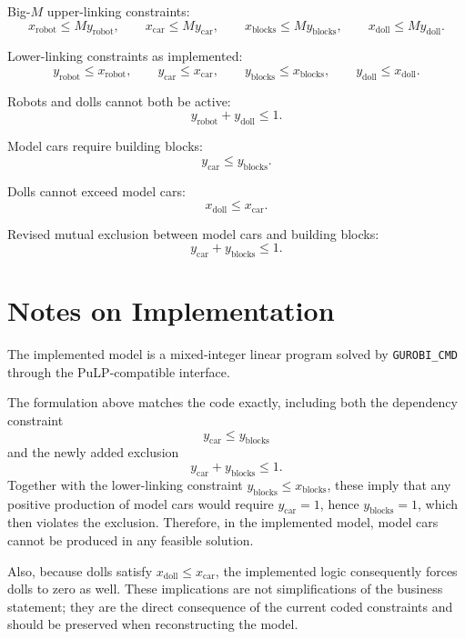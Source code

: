 Big-$M$ upper-linking constraints:
\[
x_{\text{robot}} \le M y_{\text{robot}},\qquad
x_{\text{car}} \le M y_{\text{car}},\qquad
x_{\text{blocks}} \le M y_{\text{blocks}},\qquad
x_{\text{doll}} \le M y_{\text{doll}}.
\]

Lower-linking constraints as implemented:
\[
y_{\text{robot}} \le x_{\text{robot}},\qquad
y_{\text{car}} \le x_{\text{car}},\qquad
y_{\text{blocks}} \le x_{\text{blocks}},\qquad
y_{\text{doll}} \le x_{\text{doll}}.
\]

Robots and dolls cannot both be active:
\[
y_{\text{robot}} + y_{\text{doll}} \le 1.
\]

Model cars require building blocks:
\[
y_{\text{car}} \le y_{\text{blocks}}.
\]

Dolls cannot exceed model cars:
\[
x_{\text{doll}} \le x_{\text{car}}.
\]

Revised mutual exclusion between model cars and building blocks:
\[
y_{\text{car}} + y_{\text{blocks}} \le 1.
\]

\section*{Notes on Implementation}

The implemented model is a mixed-integer linear program solved by \texttt{GUROBI\_CMD} through the PuLP-compatible interface.

The formulation above matches the code exactly, including both the dependency constraint
\[
y_{\text{car}} \le y_{\text{blocks}}
\]
and the newly added exclusion
\[
y_{\text{car}} + y_{\text{blocks}} \le 1.
\]
Together with the lower-linking constraint $y_{\text{blocks}} \le x_{\text{blocks}}$, these imply that any positive production of model cars would require $y_{\text{car}}=1$, hence $y_{\text{blocks}}=1$, which then violates the exclusion. Therefore, in the implemented model, model cars cannot be produced in any feasible solution.

Also, because dolls satisfy $x_{\text{doll}} \le x_{\text{car}}$, the implemented logic consequently forces dolls to zero as well. These implications are not simplifications of the business statement; they are the direct consequence of the current coded constraints and should be preserved when reconstructing the model.
